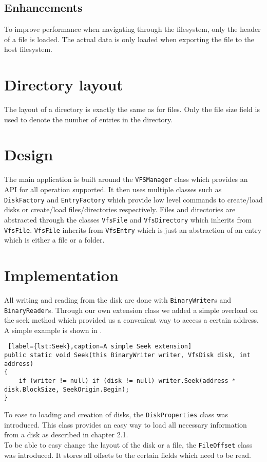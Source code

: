 \documentclass{report}
\begin{document}
\subsection{Enhancements}
To improve performance when navigating through the filesystem, only the header of a file is loaded. The actual data is only loaded when exporting the file to the host filesystem.

\section{Directory layout}
The layout of a directory is exactly the same as for files. Only the file size field is used to denote the number of entries in the directory.

\section{Design}
The main application is built around the \texttt{VFSManager} class which provides an API for all operation supported. It then uses multiple classes such as \texttt{DiskFactory} and \texttt{EntryFactory} which provide low level commands to create/load disks or create/load files/directories respectively. Files and directories are abstracted through the classes \texttt{VfsFile} and \texttt{VfsDirectory} which inherits from \texttt{VfsFile}. \texttt{VfsFile} inherits from \texttt{VfsEntry} which is just an abstraction of an entry which is either a file or a folder.

\section{Implementation}
All writing and reading from the disk are done with \texttt{BinaryWriter}s and \texttt{BinaryReader}s. Through our own extension class we added a simple overload on the seek method which provided us a convenient way to access a certain address. A simple example is shown in .\\
\begin{lstlisting} [label={lst:Seek},caption=A simple Seek extension]
public static void Seek(this BinaryWriter writer, VfsDisk disk, int address)
{
    if (writer != null) if (disk != null) writer.Seek(address * disk.BlockSize, SeekOrigin.Begin);
}
\end{lstlisting}
To ease to loading and creation of disks, the \texttt{DiskProperties} class was introduced. This class provides an easy way to load all necessary information from a disk as described in chapter 2.1. \\To be able to easy change the layout of the disk or a file, the \texttt{FileOffset} class was introduced. It stores all offsets to the certain fields which need to be read. 
\end{document}
